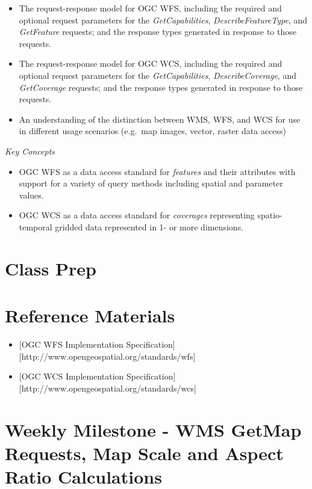 \documentclass[]{book}
\begin{document}
\begin{itemize}
\item
  The request-response model for OGC WFS, including the required and
  optional request parameters for the \emph{GetCapabilities},
  \emph{DescribeFeatureType}, and \emph{GetFeature} requests; and the
  response types generated in response to those requests.
\item
  The request-response model for OGC WCS, including the required and
  optional request parameters for the \emph{GetCapabilities},
  \emph{DescribeCoverage}, and \emph{GetCoverage} requests; and the
  response types generated in response to those requests.
\item
  An understanding of the distinction between WMS, WFS, and WCS for use
  in different usage scenarios (e.g.~map images, vector, raster data
  access)
\end{itemize}

\emph{Key Concepts}

\begin{itemize}
\item
  OGC WFS as a data access standard for \emph{features} and their
  attributes with support for a variety of query methods including
  spatial and parameter values.
\item
  OGC WCS as a data access standard for \emph{coverages} representing
  spatio-temporal gridded data represented in 1- or more dimensions.
\end{itemize}

\section{Class Prep}\label{week07-prep}

\section{Reference Materials}\label{week07-reference}

\begin{itemize}
\item
  {[}OGC WFS Implementation
  Specification{]}{[}http://www.opengeospatial.org/standards/wfs{]}
\item
  {[}OGC WCS Implementation
  Specification{]}{[}http://www.opengeospatial.org/standards/wcs{]}
\end{itemize}

\section{Weekly Milestone - WMS GetMap Requests, Map Scale and Aspect
Ratio Calculations}\label{week07-milestone}
\end{document}
